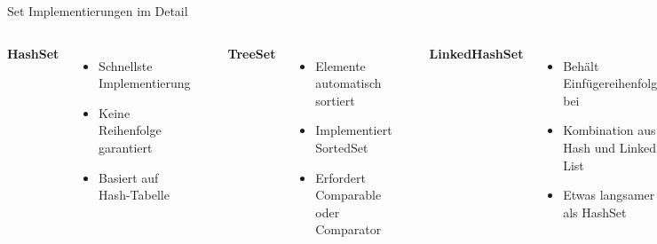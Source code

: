 \begin{frame}[fragile]{Set Implementierungen im Detail}
  \begin{columns}[T]
    \textbf{HashSet}
    \begin{itemize}
      \item Schnellste Implementierung
      \item Keine Reihenfolge garantiert
      \item Basiert auf Hash-Tabelle
    \end{itemize}

    \begin{lstlisting}[style=java, basicstyle=\tiny\ttfamily]
Set<String> words = new HashSet<>();
words.addAll(List.of("c", "a", "b"));
// Reihenfolge nicht vorhersagbar
    \end{lstlisting}

    \textbf{TreeSet}
    \begin{itemize}
      \item Elemente automatisch sortiert
      \item Implementiert SortedSet
      \item Erfordert Comparable oder Comparator
    \end{itemize}

    \begin{lstlisting}[style=java, basicstyle=\tiny\ttfamily]
Set<Integer> sorted = new TreeSet<>();
sorted.addAll(List.of(7,3,9,1));
System.out.println(sorted);
// [1, 3, 7, 9]
    \end{lstlisting}

    \textbf{LinkedHashSet}
    \begin{itemize}
      \item Behält Einfügereihenfolge bei
      \item Kombination aus Hash und Linked List
      \item Etwas langsamer als HashSet
    \end{itemize}

    \begin{lstlisting}[style=java, basicstyle=\tiny\ttfamily]
Set<String> ordered = new LinkedHashSet<>();
ordered.addAll(List.of("c", "a", "b"));
System.out.println(ordered);
// [c, a, b]
    \end{lstlisting}
  \end{columns}
\end{frame}

